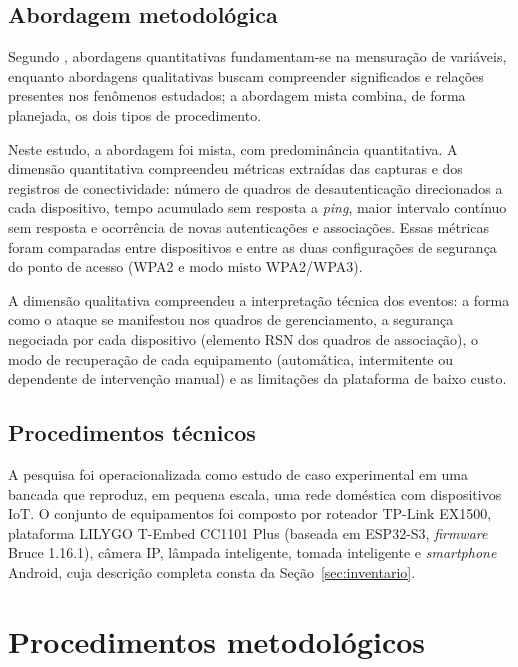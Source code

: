 \subsection{Abordagem metodológica}

Segundo , abordagens quantitativas fundamentam-se na mensuração de variáveis, enquanto abordagens qualitativas buscam compreender significados e relações presentes nos fenômenos estudados; a abordagem mista combina, de forma planejada, os dois tipos de procedimento.

Neste estudo, a abordagem foi mista, com predominância quantitativa. A dimensão quantitativa compreendeu métricas extraídas das capturas e dos registros de conectividade: número de quadros de desautenticação direcionados a cada dispositivo, tempo acumulado sem resposta a \textit{ping}, maior intervalo contínuo sem resposta e ocorrência de novas autenticações e associações. Essas métricas foram comparadas entre dispositivos e entre as duas configurações de segurança do ponto de acesso (WPA2 e modo misto WPA2/WPA3).

A dimensão qualitativa compreendeu a interpretação técnica dos eventos: a forma como o ataque se manifestou nos quadros de gerenciamento, a segurança negociada por cada dispositivo (elemento RSN dos quadros de associação), o modo de recuperação de cada equipamento (automática, intermitente ou dependente de intervenção manual) e as limitações da plataforma de baixo custo.

\subsection{Procedimentos técnicos}

A pesquisa foi operacionalizada como estudo de caso experimental em uma bancada que reproduz, em pequena escala, uma rede doméstica com dispositivos IoT. O conjunto de equipamentos foi composto por roteador TP\mbox{-}Link EX1500, plataforma LILYGO T\mbox{-}Embed CC1101 Plus (baseada em ESP32\mbox{-}S3, \textit{firmware} Bruce 1.16.1), câmera IP, lâmpada inteligente, tomada inteligente e \textit{smartphone} Android, cuja descrição completa consta da Seção~\ref{sec:inventario}.

\section{Procedimentos metodológicos}

